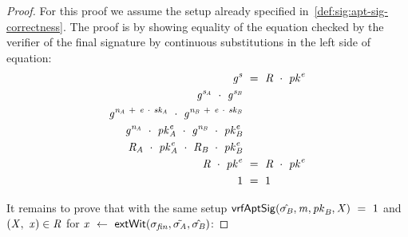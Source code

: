 \begin{proof}
    \label{prf:apt-schnorr-pre-sig-corr}
    For this proof we assume the setup already specified in~\cref{def:sig:apt-sig-correctness}.
    The proof is by showing equality of the equation checked by the verifier of the final signature by continuous substitutions in the left side of equation:
    \begin{align}
        \mathit{g}^{\mathit{s}} &~=~ \mathit{R} ~\cdot~ \mathit{pk}^{\mathit{e}} \\
        \mathit{g}^{\mathit{s}_{\mathit{A}}} ~\cdot~ \mathit{g}^{\mathit{s}_{\mathit{B}}} & \\
        \mathit{g}^{\mathit{\mathit{n}_{\mathit{A}}} ~+~ \mathit{e} ~\cdot~ \mathit{sk}_{\mathit{A}}} ~\cdot~ \mathit{g}^{\mathit{\mathit{n}_{\mathit{B}}} ~+~ \mathit{e} ~\cdot~ \mathit{sk}_{\mathit{B}}} & \\
        \mathit{g}^{\mathit{\mathit{n}_{\mathit{A}}}} ~\cdot~ \mathit{pk}_{\mathit{A}}^{\mathit{e}} ~\cdot~ \mathit{g}^{\mathit{\mathit{n}_{\mathit{B}}}} ~\cdot~ \mathit{pk}_{\mathit{B}}^{\mathit{e}} & \\
        \mathit{R}_{\mathit{A}} ~\cdot~ \mathit{pk}_{\mathit{A}}^{\mathit{e}} ~\cdot~ \mathit{R}_{\mathit{B}} ~\cdot~ \mathit{pk}_{\mathit{B}}^{\mathit{e}} & \\
        \mathit{R} ~\cdot~ \mathit{pk}^{\mathit{e}} & ~=~ \mathit{R} ~\cdot~ \mathit{pk}^{\mathit{e}} \\
        1 & ~=~ 1
    \end{align}

    It remains to prove that with the same setup $\mathsf{vrfAptSig}(\hat{\sigma_{\mathit{B}}},\mathit{m},\mathit{pk}_{\mathit{B}},\mathit{X}) ~=~ 1$ and
    $(\mathit{X} ,~ \mathit{x}) \in \mathit{R}$ for $\mathit{x} ~\leftarrow~ \mathsf{extWit}(\sigma_{\mathit{fin}}, \tilde{\sigma_{\mathit{A}}}, \hat{\sigma_{\mathit{B}}})$:


\end{proof}
